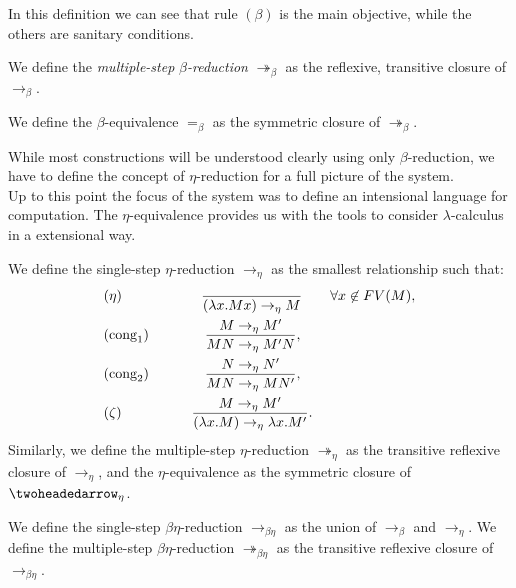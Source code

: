 In this definition we can see that rule $(\beta)$ is the main objective, while the others are sanitary conditions.

\begin{definition}
We define the \emph{multiple-step} $\beta$\emph{-reduction} $\twoheadrightarrow_\beta$ as the reflexive, transitive closure of $\to_\beta$.
\end{definition}
\begin{definition}
  We define the $\beta$-equivalence $=_\beta$ as the symmetric closure of $\twoheadrightarrow_\beta$.
\end{definition}

While most constructions will be understood clearly using only $\beta$-reduction, we have to define the concept of $\eta$-reduction for a full picture of the system.\\


Up to this point the focus of the system was to define an intensional language for computation. The $\eta$-equivalence provides us with the tools to consider $\lambda$-calculus in a extensional way. \\

\begin{definition}
We define the single-step $\eta$-reduction $\to_\eta$ as the smallest relationship such that: 
  \begin{align*}
    &(\eta) \qquad\qquad \ \ \ \  \ {\ \over(\lambda x.Mx) \to_\eta M} \qquad \forall x \not  \in FV(M),\\
    &(\operatorname{cong}_1)\qquad\qquad{ M \to_\eta M' \over MN \to_\eta M'N },\\
    &(\operatorname{cong}_2)\qquad\qquad{ N \to_\eta N' \over MN \to_\eta MN' },\\
    &(\zeta) \qquad\qquad \ \  \ {M\to_\eta M' \over(\lambda x.M) \to_\eta \lambda x.M'}.\\
  \end{align*}
  Similarly, we define the multiple-step $\eta$-reduction $\twoheadrightarrow_\eta$ as the transitive reflexive closure of $\to_\eta$, and the $\eta$-equivalence as the symmetric closure of $\twoheadedarrow_\eta$.
\end{definition}
\begin{definition}
  We define the single-step $\beta\eta$-reduction $\to_{\beta\eta}$ as the union of $\to_\beta$ and $\to_\eta$.  We define the multiple-step $\beta\eta$-reduction $\twoheadrightarrow_{\beta\eta}$ as the transitive reflexive closure of $\to_{\beta\eta}$.
\end{definition}

